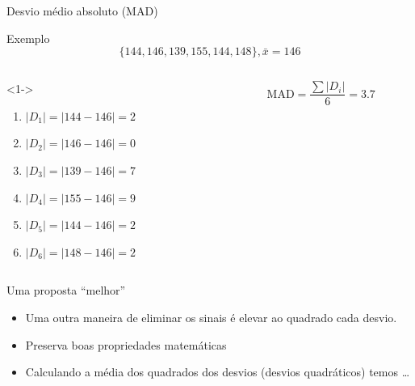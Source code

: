 \documentclass{beamer}
\begin{document}
\begin{frame}{\scriptsize Desvio médio absoluto (MAD)}
  \begin{exampleblock}{Exemplo}
    \footnotesize
  \begin{displaymath}
    \{144, 146, 139, 155, 144, 148\}, \bar{x} = 146
  \end{displaymath}
  \begin{columns}
    \begin{column}{5cm}<1->
      \begin{enumerate}
        \tiny
      \item $|D_1| = |144 - 146| = 2$
      \item $|D_2| = |146 - 146| = 0$
      \item $|D_3| = |139 - 146| = 7$
      \item $|D_4| = |155 - 146| = 9$
      \item $|D_5| = |144 - 146| = 2$
      \item $|D_6| = |148 - 146| = 2$
      \end{enumerate}
    \end{column}
    \begin{column}{5cm}
      \begin{displaymath}
        \mathrm{MAD} = \frac{\sum |D_i|}{6} = 3.7
      \end{displaymath}
    \end{column}
  \end{columns}
\end{exampleblock}
\end{frame}

\begin{frame}{\scriptsize Uma proposta ``melhor''}
  \begin{itemize}
    \footnotesize
  \item Uma outra maneira de eliminar os sinais é elevar ao quadrado
    cada desvio.
    \bigskip
  \item Preserva boas propriedades matemáticas
    \bigskip
  \item Calculando a média dos quadrados dos desvios (desvios
    quadráticos) temos \ldots
  \end{itemize}
\end{frame}
\end{document}
